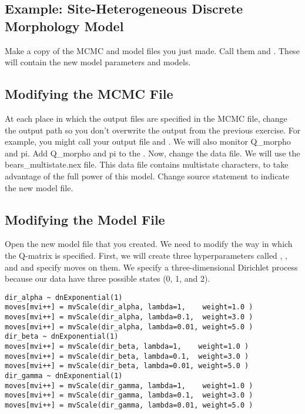 \subsection{Example: Site-Heterogeneous Discrete Morphology Model }

{\begin{framed}
Make a copy of the MCMC and model files you just made. 
Call them  and . 
These will contain the new model parameters and models. \par 
\end{framed}}

\subsection{Modifying the MCMC File}

At each place in which the output files are specified in the MCMC file, change the output path so you don't overwrite the output from the previous exercise.
For example, you might call your output file  and .
We will also monitor Q\_morpho and pi.
Add Q\_morpho and pi to the . 
Now, change the data file.
We will use the bears\_multistate.nex file. 
This data file contains multistate characters, to take advantage of the full power of this model. 
Change source statement to indicate the new model file.

\subsection{Modifying the Model File}
Open the new model file that you created. We need to modify the way in which the Q-matrix is specified.
First, we will create three hyperparameters called , , and  and specify moves on them.
We specify a three-dimensional Dirichlet process because our data have three possible states (0, 1, and 2).
{\tt \begin{snugshade*}
\begin{lstlisting}
dir_alpha ~ dnExponential(1)
moves[mvi++] = mvScale(dir_alpha, lambda=1,    weight=1.0 )
moves[mvi++] = mvScale(dir_alpha, lambda=0.1,  weight=3.0 )
moves[mvi++] = mvScale(dir_alpha, lambda=0.01, weight=5.0 )
dir_beta ~ dnExponential(1)
moves[mvi++] = mvScale(dir_beta, lambda=1,    weight=1.0 )
moves[mvi++] = mvScale(dir_beta, lambda=0.1,  weight=3.0 )
moves[mvi++] = mvScale(dir_beta, lambda=0.01, weight=5.0 )
dir_gamma ~ dnExponential(1)
moves[mvi++] = mvScale(dir_gamma, lambda=1,    weight=1.0 )
moves[mvi++] = mvScale(dir_gamma, lambda=0.1,  weight=3.0 )
moves[mvi++] = mvScale(dir_gamma, lambda=0.01, weight=5.0 )
\end{lstlisting}
\end{snugshade*}}

